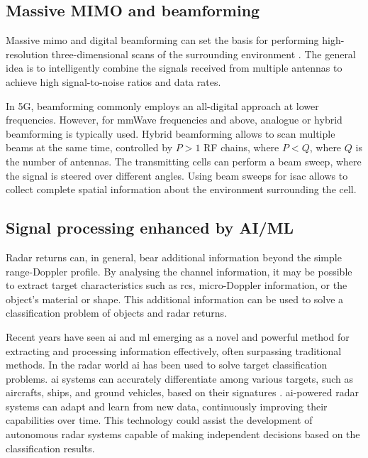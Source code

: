	 
	
	\subsection{Massive MIMO and beamforming}
	
	Massive \gls{mimo} and digital beamforming can set the basis for performing high-resolution three-dimensional scans of the surrounding environment \cite{MIMO-next-gen}.
	The general idea is to intelligently combine the signals received from multiple antennas to achieve high signal-to-noise ratios and data rates.
	
	In \gls{5G}, beamforming commonly employs an all-digital approach at lower frequencies. However, for mmWave frequencies and above, analogue or hybrid beamforming is typically used. 
	Hybrid beamforming allows to scan multiple beams at the same time, controlled by $P >1$ RF chains, where $P < Q$, where $Q$ is the number of antennas. 
	The transmitting cells can perform a beam sweep, where the signal is steered over different angles. 
	Using beam sweeps for \gls{isac} allows to collect complete spatial information about the environment surrounding the cell.
	
	\subsection{Signal processing enhanced by AI/ML}
	Radar returns can, in general, bear additional information beyond the simple range-Doppler profile. 
	By analysing the channel information, it may be possible to extract target characteristics such as \gls{rcs}, micro-Doppler information, or the object's material or shape.
	This additional information can be used to solve a classification problem of objects and radar returns.
	
	Recent years have seen \gls{ai} and \gls{ml} emerging as a novel and powerful method for extracting and processing information effectively, often surpassing traditional methods.
	In the radar world \gls{ai} has been used to solve target classification problems. 
	\Gls{ai} systems can accurately differentiate among various targets, such as aircrafts, ships, and ground vehicles, based on their signatures \cite{survey_radar_AIML}. 
	\gls{ai}-powered radar systems can adapt and learn from new data, continuously improving their capabilities over time. 
	This technology could assist the development of autonomous radar systems capable of making independent decisions based on the classification results. 
	
